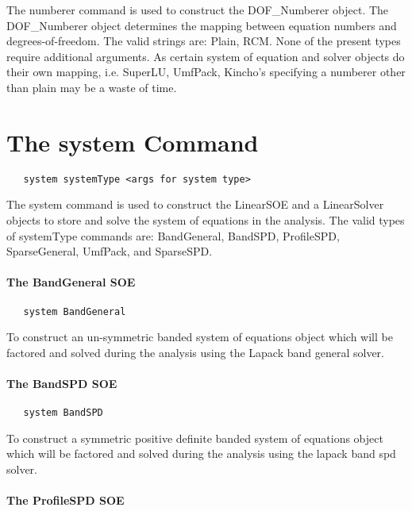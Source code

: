 \documentclass[12pt]{article}
\begin{document}
The numberer command is used to construct the DOF\_Numberer
object. The DOF\_Numberer object determines the mapping between
 equation numbers and degrees-of-freedom. The valid strings 
are: Plain, RCM. None of the present types require additional
arguments. As certain system of equation and solver objects do
their own mapping, i.e. SuperLU, UmfPack, Kincho's specifying a
numberer other than plain may be a waste of time.

\section {The system Command}
{\sf\small
\begin{verbatim}
   system systemType <args for system type>
\end{verbatim}
}

The system command is used to construct the LinearSOE and a LinearSolver
objects to store and solve the system of equations in the
analysis. The valid types of systemType commands are: BandGeneral,
BandSPD, ProfileSPD, SparseGeneral, UmfPack, and SparseSPD.

\paragraph{The BandGeneral SOE}

{\sf\small
\begin{verbatim}
   system BandGeneral
\end{verbatim}
}

\noindent To construct an un-symmetric banded system of equations
object which will be factored and solved during the analysis using the
Lapack band general solver.

\paragraph{The BandSPD SOE}

{\sf\small
\begin{verbatim}
   system BandSPD
\end{verbatim}
}

\noindent To construct a symmetric positive definite banded system of equations
object which will be factored and solved during the analysis using the
lapack band spd solver.

\paragraph{The ProfileSPD SOE}
\end{document}
